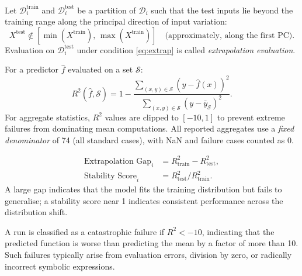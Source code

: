 \documentclass[twoside,11pt]{article}
\newcommand{\Rsq}{R^{2}}
\newcommand{\Rtrain}{R^{2}_{\mathrm{train}}}
\newcommand{\Rtest}{R^{2}_{\mathrm{test}}}
\begin{document}
\begin{definition}
Let $\mathcal{D}^{\mathrm{train}}_i$ and $\mathcal{D}^{\mathrm{test}}_i$ be a
partition of $\mathcal{D}_i$ such that the test inputs lie beyond the training range
along the principal direction of input variation:
\begin{equation}
  X^{\mathrm{test}} \notin [\min(X^{\mathrm{train}}),\, \max(X^{\mathrm{train}})]
  \quad \text{(approximately, along the first PC)}.
  \label{eq:extrap}
\end{equation}
Evaluation on $\mathcal{D}^{\mathrm{test}}_i$ under condition \eqref{eq:extrap}
is called \emph{extrapolation evaluation}.
\end{definition}

\begin{definition}
For a predictor $\hat{f}$ evaluated on a set $\mathcal{S}$:
\begin{equation}
  \Rsq(\hat{f}, \mathcal{S}) = 1 - \frac{\sum_{(x,y)\in\mathcal{S}}(y - \hat{f}(x))^2}
                                         {\sum_{(x,y)\in\mathcal{S}}(y - \bar{y}_{\mathcal{S}})^2}.
  \label{eq:r2}
\end{equation}
For aggregate statistics, $\Rsq$ values are clipped to $[-10, 1]$ to prevent
extreme failures from dominating mean computations.  All reported aggregates use a
\emph{fixed denominator} of 74 (all standard cases), with NaN and failure cases
counted as 0.
\end{definition}

\begin{definition}
\begin{align}
  \text{Extrapolation Gap}_i &= \Rtrain - \Rtest, \label{eq:gap}\\
  \text{Stability Score}_i   &= \Rtest / \Rtrain. \label{eq:stability}
\end{align}
A large gap indicates that the model fits the training distribution but fails
to generalise; a stability score near 1 indicates consistent performance across
the distribution shift.
\end{definition}

\begin{definition}
A run is classified as a catastrophic failure if $\Rsq < -10$, indicating that
the predicted function is worse than predicting the mean by a factor of more
than 10.  Such failures typically arise from evaluation errors, division by
zero, or radically incorrect symbolic expressions.
\end{definition}
\end{document}
